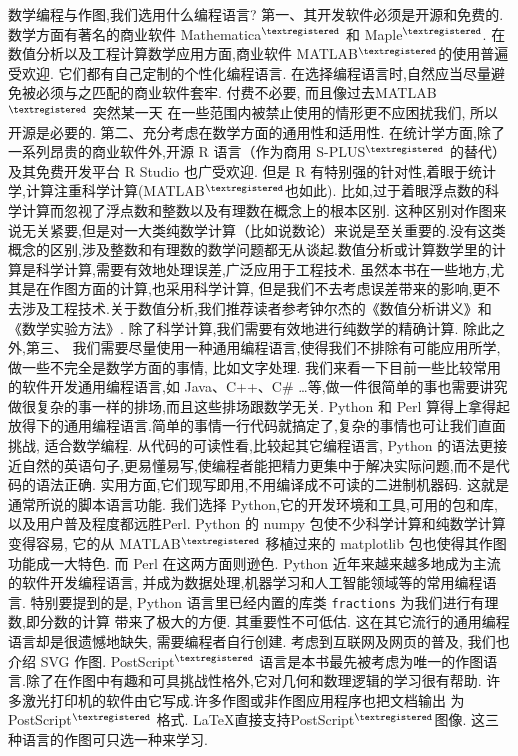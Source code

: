 数学编程与作图,我们选用什么编程语言?
第一、其开发软件必须是开源和免费的.
数学方面有著名的商业软件 Mathematica${}^{\textregistered}$ 和 Maple${}^{\textregistered}$.
在数值分析以及工程计算数学应用方面,商业软件 MATLAB${}^{\textregistered}$的使用普遍受欢迎.
它们都有自己定制的个性化编程语言.
在选择编程语言时,自然应当尽量避免被必须与之匹配的商业软件套牢.
付费不必要, 而且像过去MATLAB${}^{\textregistered}$ 突然某一天
在一些范围内被禁止使用的情形更不应困扰我们, 所以开源是必要的.
第二、充分考虑在数学方面的通用性和适用性.
在统计学方面,除了一系列昂贵的商业软件外,开源 R 语言（作为商用 S-PLUS${}^{\textregistered}$ 的替代）及其免费开发平台 R Studio 也广受欢迎.
但是 R 有特别强的针对性,着眼于统计学,计算注重科学计算(MATLAB${}^{\textregistered}$也如此).
比如,过于着眼浮点数的科学计算而忽视了浮点数和整数以及有理数在概念上的根本区别.
这种区别对作图来说无关紧要,但是对一大类纯数学计算（比如说数论）来说是至关重要的.没有这类概念的区别,涉及整数和有理数的数学问题都无从谈起.数值分析或计算数学里的计算是科学计算,需要有效地处理误差,广泛应用于工程技术.
虽然本书在一些地方,尤其是在作图方面的计算,也采用科学计算,
但是我们不去考虑误差带来的影响,更不去涉及工程技术.关于数值分析,我们推荐读者参考钟尔杰的《数值分析讲义》\cite{ZhongEr1}和
《数学实验方法》\cite{ZhongEr2}.
除了科学计算,我们需要有效地进行纯数学的精确计算.
除此之外,第三、
我们需要尽量使用一种通用编程语言,使得我们不排除有可能应用所学,做一些不完全是数学方面的事情, 比如文字处理.
我们来看一下目前一些比较常用的软件开发通用编程语言,如 Java、C++、C\# …等,做一件很简单的事也需要讲究做很复杂的事一样的排场,而且这些排场跟数学无关. 
Python 和 Perl 算得上拿得起放得下的通用编程语言.简单的事情一行代码就搞定了,复杂的事情也可让我们直面挑战, 适合数学编程.
从代码的可读性看,比较起其它编程语言, Python 的语法更接近自然的英语句子,更易懂易写,使编程者能把精力更集中于解决实际问题,而不是代码的语法正确.
实用方面,它们现写即用,不用编译成不可读的二进制机器码.
这就是通常所说的脚本语言功能.
我们选择 Python,它的开发环境和工具,可用的包和库,
以及用户普及程度都远胜Perl. Python 的 numpy 包使不少科学计算和纯数学计算变得容易, 它的从 MATLAB${}^{\textregistered}$ 移植过来的 matplotlib 包也使得其作图功能成一大特色. 而 Perl 在这两方面则逊色. 
Python 近年来越来越多地成为主流的软件开发编程语言,
并成为数据处理,机器学习和人工智能领域等的常用编程语言.
特别要提到的是, Python 语言里已经内置的库类 \verb|fractions| 为我们进行有理数,即分数的计算
带来了极大的方便. 其重要性不可低估. 这在其它流行的通用编程语言却是很遗憾地缺失, 需要编程者自行创建.
考虑到互联网及网页的普及, 我们也介绍 SVG 作图. PostScript${}^{\textregistered}$ 语言是本书最先被考虑为唯一的作图语言.除了在作图中有趣和可具挑战性格外,它对几何和数理逻辑的学习很有帮助.
许多激光打印机的软件由它写成.许多作图或非作图应用程序也把文档输出
为PostScript${}^{\textregistered}$ 格式. \LaTeX 直接支持PostScript${}^{\textregistered}$图像.
这三种语言的作图可只选一种来学习.

